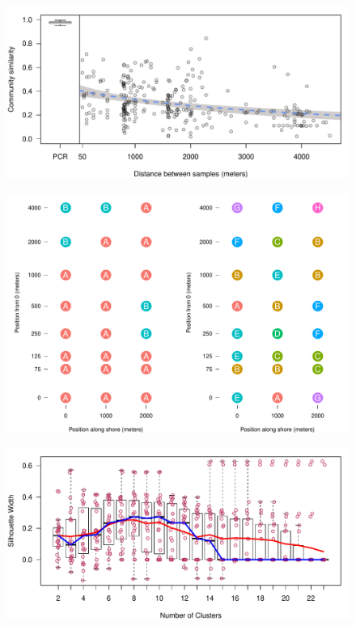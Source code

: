 \documentclass[11pt,letterpaper]{article} %
\begin{document}
\begin{figure}[H] %
  \centering
    \includegraphics[width=1\textwidth]{distance_decay.pdf}
    \caption{\protect}
  \label{distance_decay}
\end{figure}

\begin{figure}[H] %
  \centering
    \includegraphics[width=1\textwidth]{pam_in_space.pdf}
    \caption{\protect}
  \label{pam_in_space}
\end{figure}


\begin{figure}[H] %
  \centering
    \includegraphics[width=1\textwidth]{pam_sil.pdf}
    \caption{\protect}
  \label{pam_sil}
\end{figure}
\end{document}
